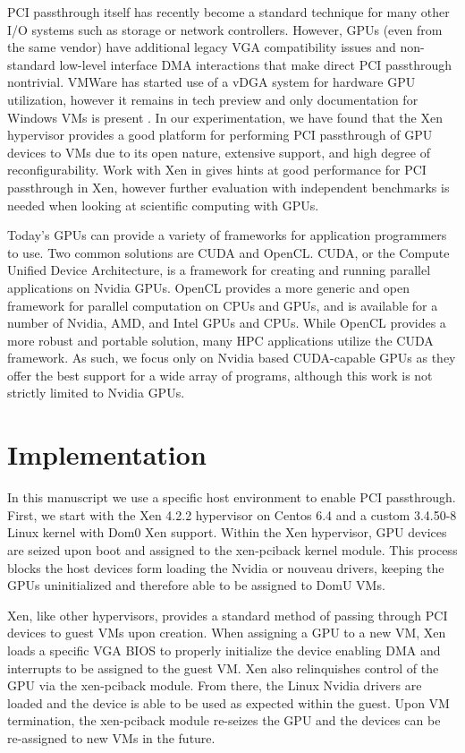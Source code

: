 PCI passthrough itself has recently become a standard technique for many other I/O systems such as storage or network controllers.  However, GPUs (even from the same vendor) have additional legacy VGA compatibility issues and non-standard low-level interface DMA interactions that make direct PCI passthrough nontrivial. VMWare has started use of a vDGA system for hardware GPU utilization, however it remains in tech preview and only documentation for Windows VMs is present \cite{vmwaregpu}.  In our experimentation, we have found that the Xen hypervisor provides a good platform for performing PCI passthrough of GPU devices to VMs due to its open nature, extensive support, and high degree of reconfigurability. Work with Xen in \cite{yang2012using} gives hints at good performance for PCI passthrough in Xen, however further evaluation with independent benchmarks is needed when looking at scientific computing with GPUs.

Today's GPUs can provide a variety of frameworks for application programmers to use. Two common solutions are CUDA and OpenCL. CUDA, or the Compute Unified Device Architecture, is a framework for creating and running parallel applications on Nvidia GPUs. OpenCL provides a more generic and open framework for parallel computation on CPUs and GPUs, and is available for a number of Nvidia, AMD, and Intel GPUs and CPUs. While OpenCL provides a more robust and portable solution, many HPC applications utilize the CUDA framework. As such, we focus only on Nvidia based CUDA-capable GPUs as they offer the best support for a wide array of programs, although this work is not strictly limited to Nvidia GPUs.

\section{Implementation}

In this manuscript we use a specific host environment to enable PCI passthrough. First, we start with the Xen 4.2.2 hypervisor on Centos 6.4 and a custom 3.4.50-8 Linux kernel with Dom0 Xen support.  Within the Xen hypervisor, GPU devices are seized upon boot and assigned to the xen-pciback kernel module. This process blocks the host devices form loading the Nvidia or nouveau drivers, keeping the GPUs uninitialized and therefore able to be assigned to DomU VMs.  

Xen, like other hypervisors, provides a standard method of passing through PCI devices to guest VMs upon creation.  When assigning a GPU to a new VM, Xen loads a specific VGA BIOS to properly initialize the device enabling DMA and interrupts to be assigned to the guest VM. Xen also relinquishes control of the GPU via the xen-pciback module. From there, the Linux Nvidia drivers are loaded and the device is able to be used as expected within the guest. Upon VM termination, the xen-pciback module re-seizes the GPU and the devices can be re-assigned to new VMs in the future. 

